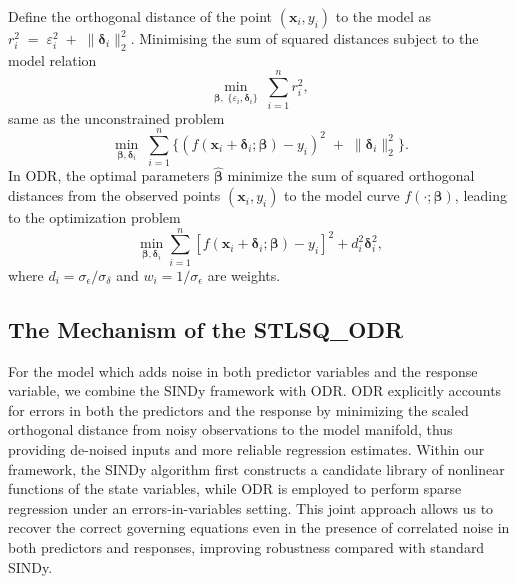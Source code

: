 Define the orthogonal distance of the point $(\boldsymbol{x}_i,y_i)$ to the model as $r_i^2 \;=\; \varepsilon_i^2 \;+\; \|\boldsymbol{\delta}_i\|_2^2.$
Minimising the sum of squared distances subject to the model relation
\begin{equation}
    \min_{\boldsymbol{\beta},\;\{\varepsilon_i,\boldsymbol{\delta}_i\}}\;\sum_{i=1}^n r_i^2,
\end{equation}
same as the unconstrained problem
\begin{equation}
\min_{\boldsymbol{\beta},{\boldsymbol{\delta}_i}} \;\sum_{i=1}^n \Big\{( f(\boldsymbol{x}_i+\boldsymbol{\delta}_i;\boldsymbol{\beta}) - y_i )^2 \;+\; \|\boldsymbol{\delta}_i\|_2^2\Big\}.
\end{equation}
In ODR, the optimal parameters $\hat{\boldsymbol{\beta}}$ minimize the sum of squared orthogonal distances from the observed points $(\boldsymbol{x}_i, y_i)$ to the model curve $f(\cdot; \boldsymbol{\beta})$, leading to the optimization problem
\begin{equation}
    \min_{\boldsymbol{\beta}, \boldsymbol{\delta}_i} \sum_{i=1}^n \left[ f(\boldsymbol{x}_i+\boldsymbol{\delta}_i; \boldsymbol{\beta}) - y_i \right]^2
+ d_i^2 \boldsymbol{\delta}_i^2,
\end{equation}
where $d_i = \sigma_\epsilon / \sigma_\delta$ and $w_i = 1 / \sigma_\epsilon$ are weights.




\subsection{The Mechanism of the STLSQ\_ODR}

For the model which adds noise in both predictor variables and the response variable, we combine the SINDy framework with ODR.
ODR explicitly accounts for errors in both the predictors and the response by minimizing the scaled orthogonal distance from noisy observations to the model manifold, thus providing de-noised inputs and more reliable regression estimates. 
Within our framework, the SINDy algorithm first constructs a candidate library of nonlinear functions of the state variables, while ODR is employed to perform sparse regression under an errors-in-variables setting. This joint approach allows us to recover the correct governing equations even in the presence of correlated noise in both predictors and responses, improving robustness compared with standard SINDy.



